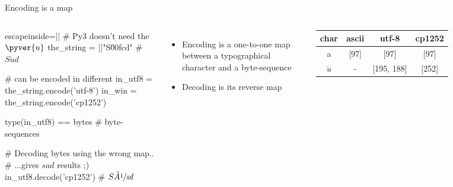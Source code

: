 \begin{pyframe}{Encoding is a map}
\begin{columns}


\begin{pycode*}{escapeinside=||}
# Py3 doesn't need the $\pyver{u}$ 
the_string = ||"S\u00fcd" # $S\ddot{u}d$

# can be encoded in different
in_utf8 =  the_string.encode('utf-8')
in_win = the_string.encode('cp1252')

type(in_utf8) == bytes # byte-sequences

# Decoding bytes using the wrong map..
# ...gives $sad$ results ;)
in_utf8.decode('cp1252') # $S\tilde{A}\sfrac{1}{4}d$





\end{pycode*}

\begin{itemize}
\item Encoding is a one-to-one map between a typographical character and a byte-sequence 
\item Decoding is its reverse map
\end{itemize}

\small
\begin{tabular}{|c||c|c|c|}\hline 
char        & ascii     & utf-8         & cp1252     \\ \hline
a           & [97]      & [97]          & [97]      \\ \hline     
$\ddot{u}$  & -         & [195, 188]    & [252]              \\ \hline
\end{tabular}
\end{columns}

\end{pyframe}




